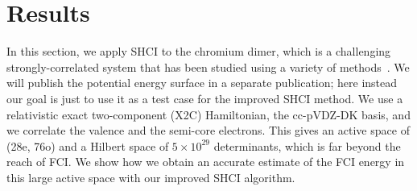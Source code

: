 \documentclass[%
reprint,
 superscriptaddress,
 amsmath,amssymb,
 aps,
]{revtex4-1}
\begin{document}






\section{Results}
\label{results}

In this section, we apply SHCI to the chromium dimer, which is a challenging strongly-correlated system
that has been studied using a variety of methods~\cite{Scu-JCP-91,KurYan-JCP-11,PurZhaKra-JCP-15,MaManOlsGag-JCTC-16,VanMalVer-JCTC-16,GuoWatHuSunCha-JCTC-16}.
We will publish the potential energy surface in a separate publication; here instead our goal is just
to use it as a test case for the improved SHCI method.
We use a relativistic exact two-component (X2C) Hamiltonian, the cc-pVDZ-DK basis, and we correlate the valence and the semi-core electrons.
This gives an active space of (28e, 76o) and a Hilbert space of $5\times10^{29}$ determinants, which is far beyond the reach of FCI.
We show how we obtain an accurate estimate of the FCI energy in this large active space with our improved SHCI algorithm.
\end{document}
